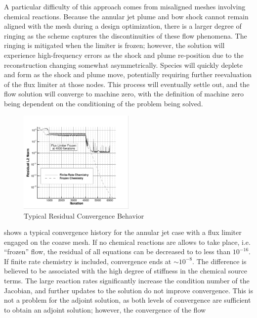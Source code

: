 A particular difficulty of this approach comes from misaligned meshes involving
chemical reactions.  Because the annular jet plume and bow shock cannot remain
aligned with the mesh during a design optimization, there is a larger degree of
ringing as the scheme captures the discontinuities of these flow phenomena.  The
ringing is mitigated when the limiter is frozen; however, the solution will
experience high-frequency errors as the shock and plume re-position due to the
reconstruction changing somewhat asymmetrically.  Species will quickly deplete
and form as the shock and plume move, potentially requiring further reevaluation
of the flux limiter at those nodes.  This process will eventually settle out,
and the flow solution will converge to machine zero, with the definition of
machine zero being dependent on the conditioning of the problem being solved.  
\begin{figure}[h]
  \centering
  \includegraphics[width=0.5\textwidth]{figures/limiters/chem-res-comp.png}
  \caption{Typical Residual Convergence Behavior}
  \label{fig:chem-res-comp}
\end{figure}
 shows a typical convergence history for the annular jet
case with a flux limiter engaged on the coarse mesh.  If no chemical reactions
are allows to take place, i.e. ``frozen'' flow, the residual of all equations
can be decreased to to less than $10^{-16}$.  If finite rate chemistry is
included, convergence ends at $\sim 10^{-8}$.  The difference is believed to be
associated with the high degree of stiffness in the chemical source terms.  The
large reaction rates significantly increase the condition number of the
Jacobian, and further updates to the solution do not improve convergence.  This
is not a problem for the adjoint solution, as both levels of convergence are
sufficient to obtain an adjoint solution; however, the convergence of the flow
